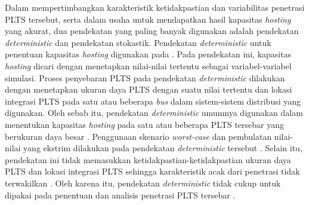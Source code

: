 Dalam mempertimbangkan karakteristik ketidakpastian dan variabilitas penetrasi PLTS tersebut, serta dalam usaha untuk mendapatkan hasil kapasitas \textit{hosting} yang akurat, dua pendekatan yang paling banyak digunakan adalah pendekatan \textit{deterministic} dan pendekatan stokastik. Pendekatan \textit{deterministic} untuk penentuan kapasitas \textit{hosting} digunakan pada \cite{Conti2007,Shayani2011,Kabir2016,Heslop2016,Luthander2017,Emmanuel2017,Abdelkader2020}. Pada pendekatan ini, kapasitas \textit{hosting} dicari dengan menetapkan nilai-nilai tertentu sebagai variabel-variabel simulasi. Proses penyebaran PLTS pada pendekatan \textit{deterministic} dilakukan dengan menetapkan ukuran daya PLTS dengan suatu nilai tertentu dan lokasi integrasi PLTS pada satu atau beberapa \textit{bus} dalam sistem-sistem distribusi yang digunakan. Oleh sebab itu, pendekatan \textit{deterministic} umumnya digunakan dalam menentukan kapasitas \textit{hosting} pada satu atau beberapa PLTS tersebar yang berukuran daya besar \cite{Wang2004,Gozel2009}. Penggunaan skenario \textit{worst-case} dan pembulatan nilai-nilai yang ekstrim dilakukan pada pendekatan \textit{deterministic} tersebut \cite{Mokryani2017}. Selain itu, pendekatan ini tidak memasukkan ketidakpastian-ketidakpastian ukuran daya PLTS dan lokasi integrasi PLTS sehingga karakteristik acak dari penetrasi tidak terwakilkan \cite{Conti2007,Kabir2016}. Oleh karena itu, pendekatan \textit{deterministic} tidak cukup untuk dipakai pada penentuan dan analisis penetrasi PLTS tersebar \cite{Zubo2017}. 

